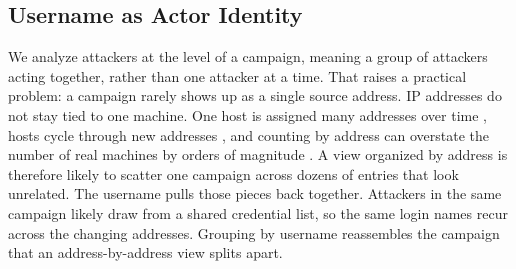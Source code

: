 \documentclass[10pt,twocolumn]{article}   %
\begin{document}
\subsection{Username as Actor Identity}

We analyze attackers at the level of a campaign, meaning a group of attackers acting together, rather than one attacker at a time. That raises a practical problem: 
a campaign rarely shows up as a single source address. IP addresses do not stay tied to one machine. One host is assigned many addresses over time 
\cite{xie2007dynamic}, hosts cycle through new addresses \cite{stone2009your}, and counting by address can overstate the number of real machines by orders of magnitude 
\cite{moura2015dynamic}. A view organized by address is therefore likely to scatter one campaign across dozens of entries that look unrelated. The username 
pulls those pieces back together. Attackers in the same campaign likely draw from a shared credential list, so the same login names recur across the changing addresses. 
Grouping by username reassembles the campaign that an address-by-address view splits apart.
\end{document}
